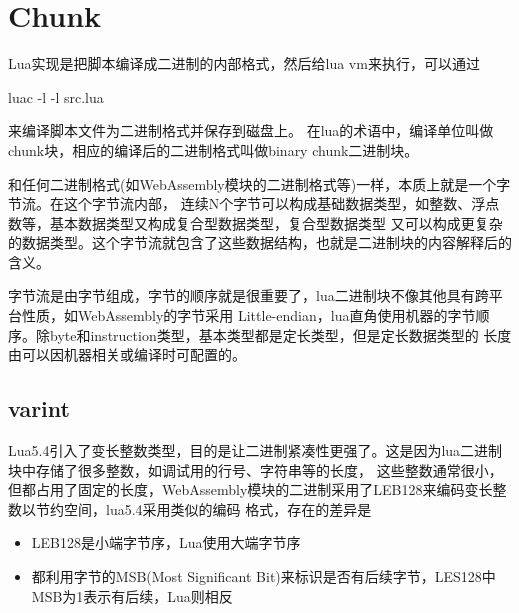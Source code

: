 \chapter{Chunk}

Lua实现是把脚本编译成二进制的内部格式，然后给lua vm来执行，可以通过

luac -l -l src.lua

来编译脚本文件为二进制格式并保存到磁盘上。
在lua的术语中，编译单位叫做chunk块，相应的编译后的二进制格式叫做binary chunk二进制块。

和任何二进制格式(如WebAssembly模块的二进制格式等)一样，本质上就是一个字节流。在这个字节流内部，
连续N个字节可以构成基础数据类型，如整数、浮点数等，基本数据类型又构成复合型数据类型，复合型数据类型
又可以构成更复杂的数据类型。这个字节流就包含了这些数据结构，也就是二进制块的内容解释后的含义。

字节流是由字节组成，字节的顺序就是很重要了，lua二进制块不像其他具有跨平台性质，如WebAssembly的字节采用
Little-endian，lua直角使用机器的字节顺序。除byte和instruction类型，基本类型都是定长类型，但是定长数据类型的
长度由可以因机器相关或编译时可配置的。


\section{varint}
Lua5.4引入了变长整数类型，目的是让二进制紧凑性更强了。这是因为lua二进制块中存储了很多整数，如调试用的行号、字符串等的长度，
这些整数通常很小，但都占用了固定的长度，WebAssembly模块的二进制采用了LEB128来编码变长整数以节约空间，lua5.4采用类似的编码
格式，存在的差异是
\begin{itemize}
    \item {LEB128是小端字节序，Lua使用大端字节序}
    \item {都利用字节的MSB(Most Significant Bit)来标识是否有后续字节，LES128中MSB为1表示有后续，Lua则相反}
\end{itemize}

